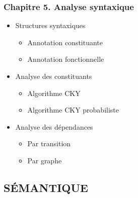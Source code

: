 \documentclass[11pt, a4paper]{article}
\begin{document}
\begin{tcolorbox}
\subsubsection*{Chapitre 5. Analyse syntaxique}

\begin{multicols}{2}
	\begin{itemize}
		
		\item Structures syntaxiques
		\begin{itemize}
			\item Annotation constituante
			\item Annotation fonctionnelle
		\end{itemize}
		
		\item Analyse des constituants
		\begin{itemize}
			\item Algorithme CKY
			\item Algorithme CKY probabiliste
		\end{itemize}
	
		\item Analyse des dépendances
		\begin{itemize}
			\item Par transition
			\item Par graphe
		\end{itemize}
		
	\end{itemize}
\end{multicols}
\end{tcolorbox}

\subsection*{\uppercase{Sémantique}}
\end{document}
